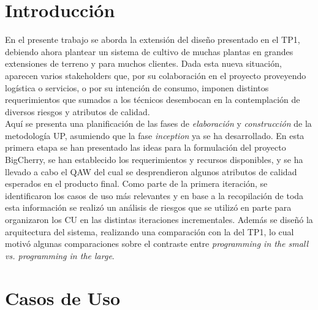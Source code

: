 \section{Introducción}

En el presente trabajo se aborda la extensión del diseño presentado en el TP1, debiendo ahora plantear un sistema de cultivo de muchas plantas en grandes extensiones de terreno y para muchos clientes. Dada esta nueva situación, aparecen varios stakeholders que, por su colaboración en el proyecto proveyendo logística o servicios, o por su intención de consumo, imponen distintos requerimientos que sumados a los técnicos desembocan en la contemplación de diversos riesgos y atributos de calidad.\\
\indent Aquí se presenta una planificación de las fases de \textit{elaboración} y \textit{construcción} de la metodología UP, asumiendo que la fase \textit{inception} ya se ha desarrollado. En esta primera etapa se han presentado las ideas para la formulación del proyecto BigCherry, se han establecido los requerimientos y recursos disponibles, y se ha llevado a cabo el QAW del cual se desprendieron algunos atributos de calidad esperados en el producto final. Como parte de la primera iteración, se identificaron los casos de uso más relevantes y en base a la recopilación de toda esta información se realizó un análisis de riesgos que se utilizó en parte para organizaron los CU en las distintas iteraciones incrementales. Además se diseñó la arquitectura del sistema, realizando una comparación con la del TP1, lo cual motivó algunas comparaciones sobre el contraste entre \textit{programming in the small vs. programming in the large}. 

\section{Casos de Uso}

